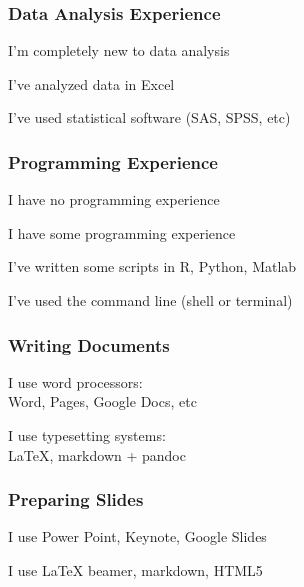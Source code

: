 \documentclass[12pt]{beamer}\usepackage[]{graphicx}\usepackage[]{color}
\begin{document}

\begin{frame}
\frametitle{Data Analysis Experience}

\bbi
 \item I'm completely new to data analysis
 \item I've analyzed data in Excel
 \item I've used statistical software (SAS, SPSS, etc)
\ei
\eb

\end{frame}


\begin{frame}
\frametitle{Programming Experience}

\bbi
 \item I have no programming experience
 \item I have some programming experience
 \item I've written some scripts in R, Python, Matlab
 \item I've used the command line (shell or terminal)
\ei
\eb

\end{frame}


\begin{frame}
\frametitle{Writing Documents}

\bbi
 \item I use word processors: \\
 Word, Pages, Google Docs, etc
 \item I use typesetting systems: \\
 LaTeX, markdown + pandoc
\ei
\eb

\end{frame}


\begin{frame}
\frametitle{Preparing Slides}

\bbi
 \item I use Power Point, Keynote, Google Slides
 \item I use LaTeX beamer, markdown, HTML5
\ei
\eb

\end{frame}
\end{document}
